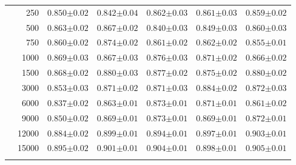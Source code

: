 \begin{table}[p]
\begin{tabularx}{0.75\textwidth}{cr| *{5}{Y}}
& 250 & $0.850{\scriptscriptstyle\pm0.02}$ & $0.842{\scriptscriptstyle\pm0.04}$ & $\mathbf{0.862{\scriptscriptstyle\pm0.03}}$ & $0.861{\scriptscriptstyle\pm0.03}$ & $0.859{\scriptscriptstyle\pm0.02}$ \\
& 500 & $0.863{\scriptscriptstyle\pm0.02}$ & $\mathbf{0.867{\scriptscriptstyle\pm0.02}}$ & $0.840{\scriptscriptstyle\pm0.03}$ & $0.849{\scriptscriptstyle\pm0.03}$ & $0.860{\scriptscriptstyle\pm0.03}$ \\
& 750 & $0.860{\scriptscriptstyle\pm0.02}$ & $\mathbf{0.874{\scriptscriptstyle\pm0.02}}$ & $0.861{\scriptscriptstyle\pm0.02}$ & $0.862{\scriptscriptstyle\pm0.02}$ & $0.855{\scriptscriptstyle\pm0.01}$ \\
& 1000 & $0.869{\scriptscriptstyle\pm0.03}$ & $0.867{\scriptscriptstyle\pm0.03}$ & $\mathbf{0.876{\scriptscriptstyle\pm0.03}}$ & $0.871{\scriptscriptstyle\pm0.02}$ & $0.866{\scriptscriptstyle\pm0.02}$ \\
& 1500 & $0.868{\scriptscriptstyle\pm0.02}$ & $\mathbf{0.880{\scriptscriptstyle\pm0.03}}$ & $0.877{\scriptscriptstyle\pm0.02}$ & $0.875{\scriptscriptstyle\pm0.02}$ & $\mathbf{0.880{\scriptscriptstyle\pm0.02}}$ \\
& 3000 & $0.853{\scriptscriptstyle\pm0.03}$ & $0.871{\scriptscriptstyle\pm0.02}$ & $0.871{\scriptscriptstyle\pm0.03}$ & $\mathbf{0.884{\scriptscriptstyle\pm0.02}}$ & $0.872{\scriptscriptstyle\pm0.03}$ \\
& 6000 & $0.837{\scriptscriptstyle\pm0.02}$ & $0.863{\scriptscriptstyle\pm0.01}$ & $\mathbf{0.873{\scriptscriptstyle\pm0.01}}$ & $0.871{\scriptscriptstyle\pm0.01}$ & $0.861{\scriptscriptstyle\pm0.02}$ \\
& 9000 & $0.850{\scriptscriptstyle\pm0.02}$ & $0.869{\scriptscriptstyle\pm0.01}$ & $\mathbf{0.873{\scriptscriptstyle\pm0.01}}$ & $0.869{\scriptscriptstyle\pm0.01}$ & $0.872{\scriptscriptstyle\pm0.01}$ \\
& 12000 & $0.884{\scriptscriptstyle\pm0.02}$ & $0.899{\scriptscriptstyle\pm0.01}$ & $0.894{\scriptscriptstyle\pm0.01}$ & $0.897{\scriptscriptstyle\pm0.01}$ & $\mathbf{0.903{\scriptscriptstyle\pm0.01}}$ \\
& 15000 & $0.895{\scriptscriptstyle\pm0.02}$ & $0.901{\scriptscriptstyle\pm0.01}$ & $0.904{\scriptscriptstyle\pm0.01}$ & $0.898{\scriptscriptstyle\pm0.01}$ & $\mathbf{0.905{\scriptscriptstyle\pm0.01}}$ \\
        \\
    \end{tabularx}
\end{table}


